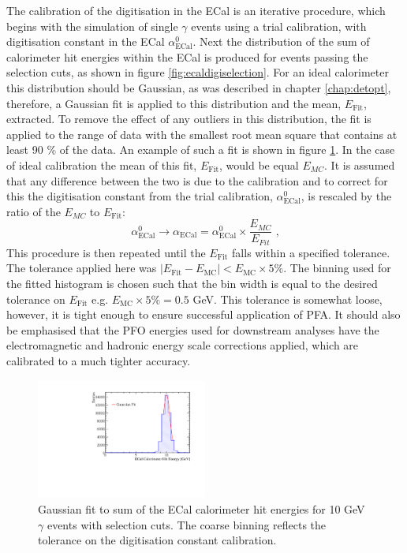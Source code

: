 The calibration of the digitisation in the ECal is an iterative procedure, which begins with the simulation of single $\gamma$ events using a trial calibration, with digitisation constant in the ECal $\alpha^{0}_{\text{ECal}}$.  Next the distribution of the sum of calorimeter hit energies within the ECal is produced for events passing the selection cuts, as shown in figure \ref{fig:ecaldigiselection}.  For an ideal calorimeter this distribution should be Gaussian, as was described in chapter \ref{chap:detopt}, therefore, a Gaussian fit is applied to this distribution and the mean, $E_{\text{Fit}}$, extracted.  To remove the effect of any outliers in this distribution, the fit is applied to the range of data with the smallest root mean square that contains at least 90 \% of the data.  An example of such a fit is shown in figure \ref{fig:ecaldigifit}.  In the case of ideal calibration the mean of this fit, $E_{\text{Fit}}$, would be equal $E_{MC}$.  It is assumed that any difference between the two is due to the calibration and to correct for this the digitisation constant from the trial calibration, $\alpha^{0}_{\text{ECal}}$, is rescaled by the ratio of the $E_{MC}$ to $E_{\text{Fit}}$:
%
\begin{equation}
\alpha^{0}_{\text{ECal}} \rightarrow \alpha_{\text{ECal}} = \alpha^{0}_{\text{ECal}} \times \frac{E_{MC}}{E_{Fit}}\text{ ,}
\end{equation}
%
This procedure is then repeated until the $E_{\text{Fit}}$ falls within a specified tolerance.  The tolerance applied here was $|E_{\text{Fit}} - E_{\text{MC}}| < E_{\text{MC}} \times 5 \%$.  The binning used for the fitted histogram is chosen such that the bin width is equal to the desired tolerance on $E_{\text{Fit}}$ e.g. $E_{\text{MC}} \times 5 \% = 0.5$ GeV.  This tolerance is somewhat loose, however, it is tight enough to ensure successful application of PFA.  It should also be emphasised that the PFO energies used for downstream analyses have the electromagnetic and hadronic energy scale corrections applied, which are calibrated to a much tighter accuracy.

\begin{figure}[h!]
\includegraphics[width=0.5\textwidth]{EnergyEstimators/Plots/Calibration/Digitsation/ECal/DigitisationECalFit.pdf}
\caption[Gaussian fit to sum of the ECal calorimeter hit energies for 10 GeV $\gamma$ events with selection cuts.  The coarse binning reflects the tolerance on the digitisation constant calibration.]{Gaussian fit to sum of the ECal calorimeter hit energies for 10 GeV $\gamma$ events with selection cuts.  The coarse binning reflects the tolerance on the digitisation constant calibration.}
\label{fig:ecaldigifit}
\end{figure}

